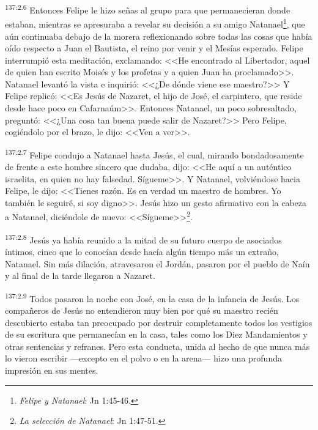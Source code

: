 \par 
\textsuperscript{137:2.6} Entonces Felipe le hizo señas al grupo para que permanecieran donde estaban, mientras se apresuraba a revelar su decisión a su amigo Natanael\footnote{\textit{Felipe y Natanael}: Jn 1:45-46.}, que aún continuaba debajo de la morera reflexionando sobre todas las cosas que había oído respecto a Juan el Bautista, el reino por venir y el Mesías esperado. Felipe interrumpió esta meditación, exclamando: <<He encontrado al Libertador, aquel de quien han escrito Moisés y los profetas y a quien Juan ha proclamado>>. Natanael levantó la vista e inquirió: <<¿De dónde viene ese maestro?>> Y Felipe replicó: <<Es Jesús de Nazaret, el hijo de José, el carpintero, que reside desde hace poco en Cafarnaúm>>. Entonces Natanael, un poco sobresaltado, preguntó: <<¿Una cosa tan buena puede salir de Nazaret?>> Pero Felipe, cogiéndolo por el brazo, le dijo: <<Ven a ver>>.

\par 
\textsuperscript{137:2.7} Felipe condujo a Natanael hasta Jesús, el cual, mirando bondadosamente de frente a este hombre sincero que dudaba, dijo: <<He aquí a un auténtico israelita, en quien no hay falsedad. Sígueme>>. Y Natanael, volviéndose hacia Felipe, le dijo: <<Tienes razón. Es en verdad un maestro de hombres. Yo también le seguiré, si soy digno>>. Jesús hizo un gesto afirmativo con la cabeza a Natanael, diciéndole de nuevo: <<Sígueme>>\footnote{\textit{La selección de Natanael}: Jn 1:47-51.}.

\par 
\textsuperscript{137:2.8} Jesús ya había reunido a la mitad de su futuro cuerpo de asociados íntimos, cinco que lo conocían desde hacía algún tiempo más un extraño, Natanael. Sin más dilación, atravesaron el Jordán, pasaron por el pueblo de Naín y al final de la tarde llegaron a Nazaret.

\par 
\textsuperscript{137:2.9} Todos pasaron la noche con José, en la casa de la infancia de Jesús. Los compañeros de Jesús no entendieron muy bien por qué su maestro recién descubierto estaba tan preocupado por destruir completamente todos los vestigios de su escritura que permanecían en la casa, tales como los Diez Mandamientos y otras sentencias y refranes. Pero esta conducta, unida al hecho de que nunca más lo vieron escribir ---excepto en el polvo o en la arena--- hizo una profunda impresión en sus mentes.

